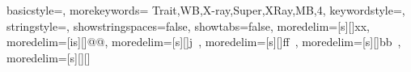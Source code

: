 \usepackage{listings}
\usepackage{subfiles}
\usepackage{textcomp}
\usepackage{xcolor}
\usepackage[ampersand]{easylist}

{
  basicstyle=\ttfamily,
  morekeywords={
  Trait,WB,X-ray,Super,XRay,MB,4},
  keywordstyle=\color{red},
  stringstyle=\color{red},
  showstringspaces=false,
  showtabs=false,
  moredelim=[s][\color{blue}]{x}{x},
  moredelim=[is][\color{violet}]{@}{@},
  moredelim=[s][\color{gray}]{j}{\ },
  moredelim=[s][\color{green}]{ff}{\ },
moredelim=[s][\color{green}]{bb}{\ },
moredelim=[s][\color{teal}]{[}{]}
}